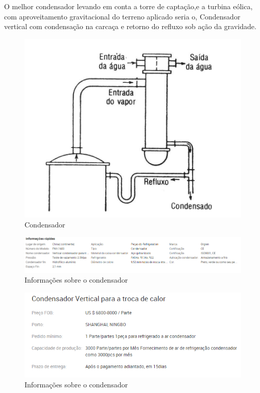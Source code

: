 O melhor condensador levando em conta a torre de captação,e a turbina eólica, com aproveitamento gravitacional do terreno aplicado seria o, Condensador vertical com condensação na carcaça e retorno do refluxo sob ação da gravidade.
	\begin{figure}[!htbp]
	 \centering
	  \includegraphics[scale=0.4]{editaveis/figuras/condensador}
	  \caption[Condensador]{Condensador\footnotemark}
	  \label{condensador}
	\end{figure}	   
	\FloatBarrier
	\begin{figure}[!htbp]
	 \centering
	  \includegraphics[scale=0.4]{editaveis/figuras/informacao_condensador}
	  \caption[Informações sobre o condensador]{Informações sobre o condensador\footnotemark}
	  \label{condensador_informacao_1}
	\end{figure}	
	\FloatBarrier	
	\begin{figure}[!htbp]
	 \centering
	  \includegraphics[scale=0.4]{editaveis/figuras/condensador_vertical}
	  \caption[Informações sobre o condensador 2]{Informações sobre o condensador\footnotemark}
	  \label{condensador_informacao_2}
	\end{figure}
		\FloatBarrier